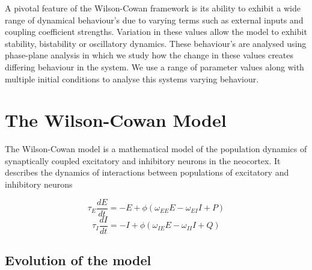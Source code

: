 \documentclass[10pt]{article}
\begin{document}
\begin{flushleft}
    A pivotal feature of the Wilson-Cowan framework is its ability to exhibit a wide range of dynamical behaviour's due to varying terms such as external inputs and coupling coefficient strengths. Variation in these values allow the model to exhibit stability, bistability or oscillatory dynamics. These behaviour's are analysed using phase-plane analysis in which we study how the change in these values creates differing behaviour in the system. We use a range of parameter values along with multiple initial conditions to analyse this systems varying behaviour.
\end{flushleft}

\section{The Wilson-Cowan Model}

\begin{flushleft}
The Wilson-Cowan model is a mathematical model of the population dynamics of synaptically coupled excitatory and inhibitory neurons in the neocortex. It describes the dynamics of interactions between populations of excitatory and inhibitory neurons

\begin{equation}
\tau_E \frac{dE}{dt}= -E + \phi(\omega_{EE}E - \omega_{EI}I +P)
\end{equation}
\begin{equation}
\tau_I \frac{dI}{dt}= -I + \phi(\omega_{IE}E - \omega_{II}I +Q)
\end{equation}

\end{flushleft}

\subsection{Evolution of the model}
\end{document}
